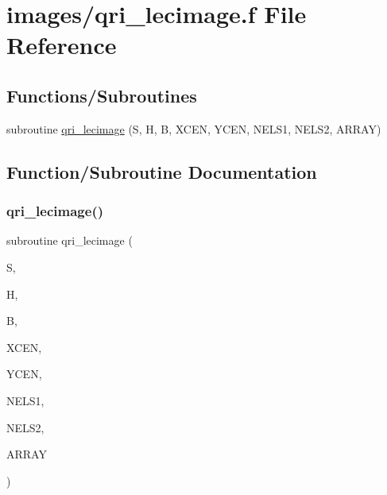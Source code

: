\hypertarget{qri__lecimage_8f}{}\section{images/qri\+\_\+lecimage.f File Reference}
\label{qri__lecimage_8f}
\subsection*{Functions/\+Subroutines}
\begin{DoxyCompactItemize}
\item 
subroutine \hyperlink{qri__lecimage_8f_a956bc37dddf000c3e359cd933386262c}{qri\+\_\+lecimage} (S, H, B, X\+C\+EN, Y\+C\+EN, N\+E\+L\+S1, N\+E\+L\+S2, A\+R\+R\+AY)
\end{DoxyCompactItemize}


\subsection{Function/\+Subroutine Documentation}
\mbox{\label{qri__lecimage_8f_a956bc37dddf000c3e359cd933386262c}} 
\subsubsection{\texorpdfstring{qri\+\_\+lecimage()}{qri\_lecimage()}}
{\footnotesize\ttfamily subroutine qri\+\_\+lecimage (\begin{DoxyParamCaption}\item[{double precision}]{S,  }\item[{double precision}]{H,  }\item[{double precision}]{B,  }\item[{double precision}]{X\+C\+EN,  }\item[{double precision}]{Y\+C\+EN,  }\item[{integer}]{N\+E\+L\+S1,  }\item[{integer}]{N\+E\+L\+S2,  }\item[{double precision, dimension(nels1,nels2)}]{A\+R\+R\+AY }\end{DoxyParamCaption})}

